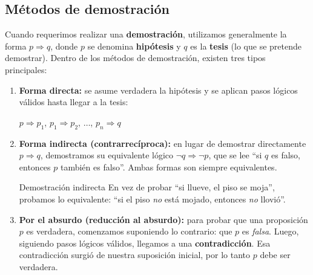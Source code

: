 \subsection{Métodos de demostración}

Cuando requerimos realizar una \textbf{demostración}, utilizamos generalmente la forma $p \Rightarrow q$, donde $p$ se denomina \textbf{hipótesis} y $q$ es la \textbf{tesis} (lo que se pretende demostrar). Dentro de los métodos de demostración, existen tres tipos principales:

\begin{enumerate}
    \item \textbf{Forma directa:} se asume verdadera la hipótesis y se aplican pasos lógicos válidos hasta llegar a la tesis:
    \begin{center}
        $p \Rightarrow p_{1}$, \quad $p_{1} \Rightarrow p_{2}$, \quad $\ldots$, \quad $p_{n} \Rightarrow q$
    \end{center}

    \item \textbf{Forma indirecta (contrarrecíproca):} en lugar de demostrar directamente $p \Rightarrow q$, demostramos su equivalente lógico $\lnot q \Rightarrow \lnot p$, que se lee ``si $q$ es falso, entonces $p$ también es falso''. Ambas formas son siempre equivalentes.

    \begin{ejem}{Demostración indirecta}
        En vez de probar ``si llueve, el piso se moja'', probamos lo equivalente: ``si el piso \emph{no} está mojado, entonces \emph{no} llovió''.
    \end{ejem}

    \item \textbf{Por el absurdo (reducción al absurdo):} para probar que una proposición $p$ es verdadera, comenzamos suponiendo lo contrario: que $p$ es \emph{falsa}. Luego, siguiendo pasos lógicos válidos, llegamos a una \textbf{contradicción}. Esa contradicción surgió de nuestra suposición inicial, por lo tanto $p$ debe ser verdadera.
\end{enumerate}
